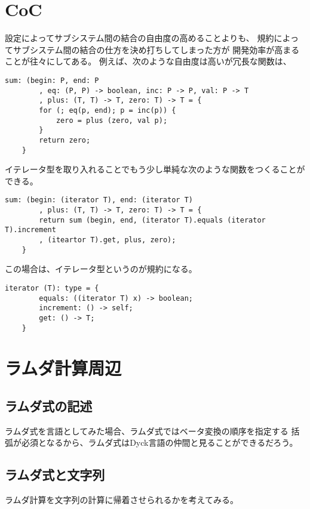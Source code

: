 	{\setlength\arraycolsep{2pt}
\section{CoC}\label{s1:CoC} %
	設定によってサブシステム間の結合の自由度の高めることよりも、
	規約によってサブシステム間の結合の仕方を決め打ちしてしまった方が
	開発効率が高まることが往々にしてある。
	例えば、次のような自由度は高いが冗長な関数は、
	\begin{lstlisting}[caption=冗長な例, label=code:冗長な例]
	sum: (begin: P, end: P
		, eq: (P, P) -> boolean, inc: P -> P, val: P -> T
		, plus: (T, T) -> T, zero: T) -> T = {
		for (; eq(p, end); p = inc(p)) {
			zero = plus (zero, val p);
		}
		return zero;
	}
	\end{lstlisting}
	イテレータ型を取り入れることでもう少し単純な次のような関数をつくることが
	できる。
	\begin{lstlisting}[caption=単純化した例, label=code:単純化した例]
	sum: (begin: (iterator T), end: (iterator T)
		, plus: (T, T) -> T, zero: T) -> T = {
		return sum (begin, end, (iterator T).equals (iterator T).increment
		, (iteartor T).get, plus, zero);
	}
	\end{lstlisting}
	この場合は、イテレータ型というのが規約になる。
	\begin{lstlisting}[caption=イテレータ型, label=code:イテレータ型]
	iterator (T): type = {
		equals: ((iterator T) x) -> boolean;
		increment: () -> self;
		get: () -> T;
	}
	\end{lstlisting}
\section{ラムダ計算周辺}\label{s1:ラムダ計算周辺} %
\subsection{ラムダ式の記述}\label{s2:ラムダ式の記述} %
	ラムダ式を言語としてみた場合、ラムダ式ではベータ変換の順序を指定する
	括弧が必須となるから、ラムダ式はDyck言語の仲間と見ることができるだろう。
\subsection{ラムダ式と文字列}\label{s2:ラムダ式と文字列} %
	ラムダ計算を文字列の計算に帰着させられるかを考えてみる。

}
